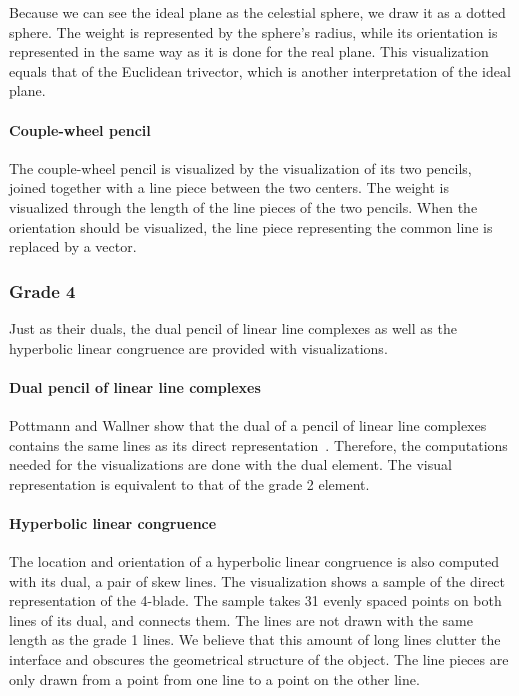 Because we can see the ideal plane as the celestial sphere, we draw it as a dotted sphere.  The weight is represented by the sphere's radius, while its orientation is represented in the same way as it is done for the real plane.  This visualization equals that of the Euclidean trivector, which is another interpretation of the ideal plane.

\paragraph{Couple-wheel pencil}
The couple-wheel pencil is visualized by the visualization of its two pencils, joined together with a line piece between the two centers.  The weight is visualized through the length of the line pieces of the two pencils.  When the orientation should be visualized, the line piece representing the common line is replaced by a vector.

\subsubsection{Grade 4}
Just as their duals, the dual pencil of linear line complexes as well as the hyperbolic linear congruence are provided with visualizations.

\paragraph{Dual pencil of linear line complexes}
Pottmann and Wallner show that the dual of a pencil of linear line complexes contains the same lines as its direct representation~\cite[Section 3.2.1]{Pottmann}.  Therefore, the computations needed for the visualizations are done with the dual element.  The visual representation is equivalent to that of the grade 2 element.

\paragraph{Hyperbolic linear congruence}
The location and orientation of a hyperbolic linear congruence is also computed with its dual, a pair of skew lines.  The visualization shows a sample of the direct representation of the 4-blade.  The sample takes 31 evenly spaced points on both lines of its dual, and connects them.  The lines are not drawn with the same length as the grade 1 lines.  We believe that this amount of long lines clutter the interface and obscures the geometrical structure of the object.  The line pieces are only drawn from a point from one line to a point on the other line.

